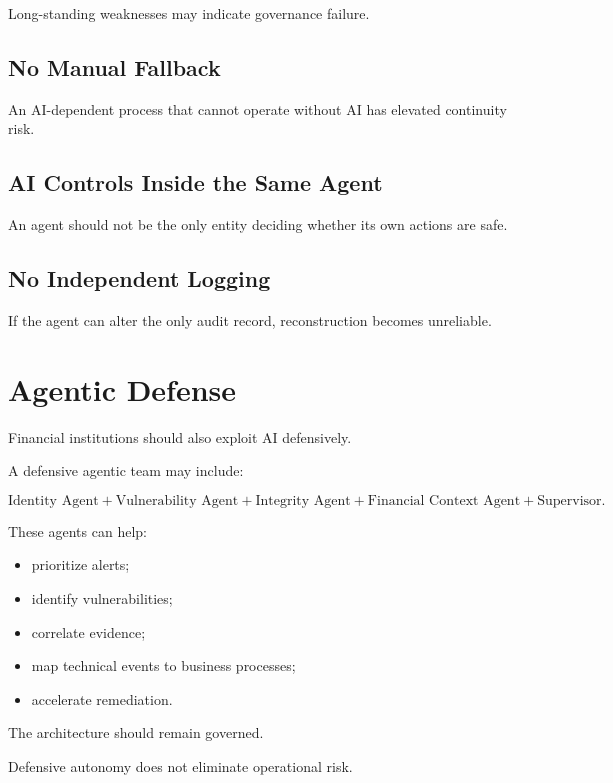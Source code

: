 Long-standing weaknesses may indicate governance failure.

\subsection{No Manual Fallback}

An AI-dependent process that cannot operate without AI has elevated continuity risk.

\subsection{AI Controls Inside the Same Agent}

An agent should not be the only entity deciding whether its own actions are safe.

\subsection{No Independent Logging}

If the agent can alter the only audit record, reconstruction becomes unreliable.

\section{Agentic Defense}

Financial institutions should also exploit AI defensively.

A defensive agentic team may include:

\begin{equation}
\text{Identity Agent}
+
\text{Vulnerability Agent}
+
\text{Integrity Agent}
+
\text{Financial Context Agent}
+
\text{Supervisor}.
\end{equation}

These agents can help:

\begin{itemize}
    \item prioritize alerts;
    \item identify vulnerabilities;
    \item correlate evidence;
    \item map technical events to business processes;
    \item accelerate remediation.
\end{itemize}

The architecture should remain governed.

Defensive autonomy does not eliminate operational risk.

